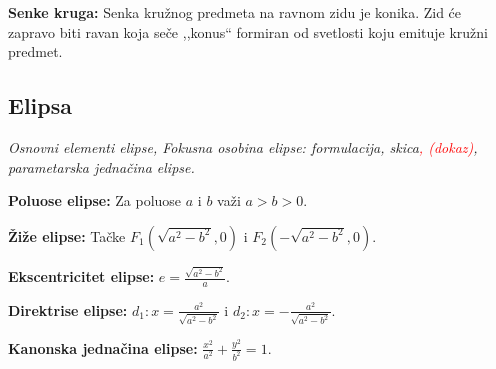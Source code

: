 \documentclass[12pt]{article}
\newcommand{\ocena}[1]{\textcolor{red}{#1}}
\begin{document}
\textbf{Senke kruga:} Senka kružnog predmeta na ravnom zidu je konika. Zid
će zapravo biti ravan koja seče ,,konus`` formiran od svetlosti koju emituje
kružni predmet.

\subsection{Elipsa}
\textit{Osnovni elementi elipse, Fokusna osobina elipse: formulacija,
    skica\ocena{, (dokaz)}, parametarska jednačina elipse.}
\par
\vspace*{1cm}

\textbf{Poluose elipse:} Za poluose $a$ i $b$ važi $a>b>0$.
\par

\textbf{Žiže elipse:} Tačke $F_1(\sqrt{a^2-b^2},0)$ i $F_2(-\sqrt{a^2-b^2},0)$.
\par

\textbf{Ekscentricitet elipse:} $e=\frac{\sqrt{a^2-b^2}}{a}$.
\par

\textbf{Direktrise elipse:} $d_1: x=\frac{a^2}{\sqrt{a^2-b^2}}$ i
$d_2: x=-\frac{a^2}{\sqrt{a^2-b^2}}$.
\par

\textbf{Kanonska jednačina elipse:} $\frac{x^2}{a^2}+\frac{y^2}{b^2}=1$.
\par
\end{document}
